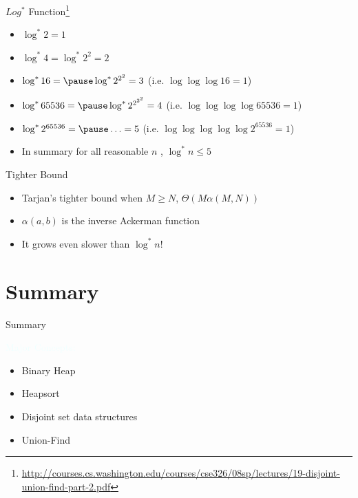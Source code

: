 \documentclass{beamer}
\newcommand{\tblue}[1]{{\Large {\textcolor{azure}{#1}}}}
\begin{document}
\begin{frame}{$Log^{*}$ Function\footnote{\url{http://courses.cs.washington.edu/courses/cse326/08sp/lectures/19-disjoint-union-find-part-2.pdf}}}
    \begin{itemize}
        \item $\log^{*} 2 = 1$
        \item $\log^{*} 4 = \log^{*} 2^2 = 2$
        \item $\log^{*} 16 = \pause \log^{*} 2^{2^{2}} = 3$ (i.e. $\log \log \log 16 = 1$)
        \item $\log^{*} 65536 = \pause \log^{*} 2^{2^{2^{2}}} = 4$ (i.e. $\log \log \log \log 65536 = 1$)
        \item $\log^{*} 2^{65536} = \pause \ldots = 5$ (i.e. $\log \log \log \log \log 2^65536 = 1$)
        \item In summary for all reasonable $n$ , $\log^{*} n \leq 5 $
    \end{itemize}
\end{frame}


\begin{frame}{Tighter Bound}
    \begin{itemize}
        \item Tarjan's tighter bound when $M \geq N$, $\Theta( M \alpha(M, N))$
        \item $\alpha(a,b)$ is the inverse Ackerman function
        \item It grows even slower than $\log^{*} n$!
    \end{itemize}
\end{frame}

\section{Summary}

\begin{frame}{Summary}

\tblue{Major Concepts:}
\begin{itemize}
\item Binary Heap
\item Heapsort
\item Disjoint set data structures
\item Union-Find
\end{itemize}
\end{frame}
\end{document}
